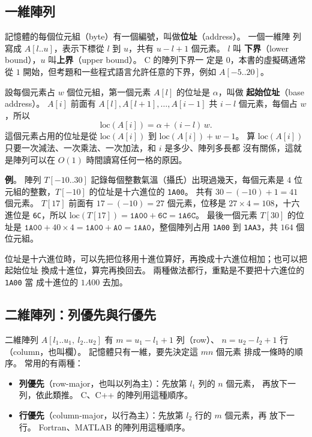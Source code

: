 \subsection{一維陣列}

記憶體的每個位元組（byte）有一個編號，叫做\textbf{位址}（address）。 一個一維陣
列寫成 $A[l..u]$，表示下標從 $l$ 到 $u$，共有 $u - l + 1$ 個元素。 $l$ 叫
\textbf{下界}（lower bound），$u$ 叫\textbf{上界}（upper bound）。 C 的陣列下界一
定是 $0$，本書的虛擬碼通常從 $1$ 開始，但考題和一些程式語言允許任意的下界，例如
$A[-5..20]$。

設每個元素占 $w$ 個位元組，第一個元素 $A[l]$ 的位址是 $\alpha$，叫做
\textbf{起始位址}（base address）。 $A[i]$ 前面有 $A[l], A[l+1], \ldots, A[i-1]$
共 $i - l$ 個元素，每個占 $w$，所以
\begin{equation}
\mathrm{loc}(A[i]) = \alpha + (i - l)\,w .
\label{eq:arr-1d}
\end{equation}
這個元素占用的位址是從 $\mathrm{loc}(A[i])$ 到 $\mathrm{loc}(A[i]) + w - 1$。 算
$\mathrm{loc}(A[i])$ 只要一次減法、一次乘法、一次加法，和 $i$ 是多少、陣列多長都
沒有關係，這就是陣列可以在 $O(1)$ 時間讀寫任何一格的原因。

\textbf{例}。 陣列 $T[-10..30]$ 記錄每個整數氣溫（攝氏）出現過幾天，每個元素是
$4$ 位元組的整數，$T[-10]$ 的位址是十六進位的 \texttt{1A00}。 共有
$30 - (-10) + 1 = 41$ 個元素。 $T[17]$ 前面有 $17 - (-10) = 27$ 個元素，位移是
$27 \times 4 = 108$，十六進位是 \texttt{6C}，所以
$\mathrm{loc}(T[17]) = \texttt{1A00} + \texttt{6C} = \texttt{1A6C}$。 最後一個元素
$T[30]$ 的位址是 $\texttt{1A00} + 40 \times 4 = \texttt{1A00} + \texttt{A0} =
\texttt{1AA0}$，整個陣列占用 \texttt{1A00} 到 \texttt{1AA3}，共 $164$ 個位元組。

位址是十六進位時，可以先把位移用十進位算好，再換成十六進位相加；也可以把起始位址
換成十進位，算完再換回去。 兩種做法都行，重點是不要把十六進位的 \texttt{1A00} 當
成十進位的 $1A00$ 去加。

\subsection{二維陣列：列優先與行優先}

二維陣列 $A[l_1..u_1,\ l_2..u_2]$ 有 $m = u_1 - l_1 + 1$ 列（row）、
$n = u_2 - l_2 + 1$ 行（column，也叫欄）。 記憶體只有一維，要先決定這 $mn$ 個元素
排成一條時的順序。 常用的有兩種：

\begin{itemize}
\item \textbf{列優先}（row-major，也叫以列為主）：先放第 $l_1$ 列的 $n$ 個元素，
再放下一列，依此類推。 C、C++ 的陣列用這種順序。
\item \textbf{行優先}（column-major，以行為主）：先放第 $l_2$ 行的 $m$ 個元素，再
放下一行。 Fortran、MATLAB 的陣列用這種順序。
\end{itemize}

